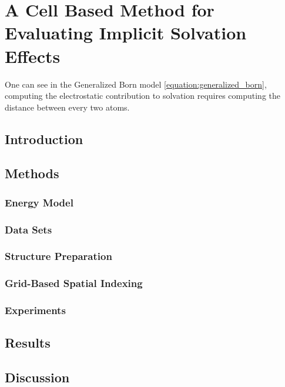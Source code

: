 \chapter[Cell Based Implicit Solvent]{A Cell Based Method for Evaluating Implicit Solvation Effects}
\label{chapter:cell_solvent}

One can see in the Generalized Born model \eqref{equation:generalized_born}, computing the electrostatic contribution to solvation requires computing the distance between every two atoms.

\section{Introduction}
\label{section:cell/intro}



\section{Methods}
\label{section:cell/methods}
    \subsection{Energy Model}
    \label{subsection:energy_model}
    

    \subsection{Data Sets}
    \label{subsection:data_sets}
    

    \subsection{Structure Preparation}
    \label{subsection:structure_preparation}
    

    \subsection{Grid-Based Spatial Indexing}
    \label{subsection:grid_based_indexing}
    

    \subsection{Experiments}
    \label{subsection:experiments}
    


\section{Results}
\label{section:cell/results}



\section{Discussion}
\label{section:cell/discussion}

